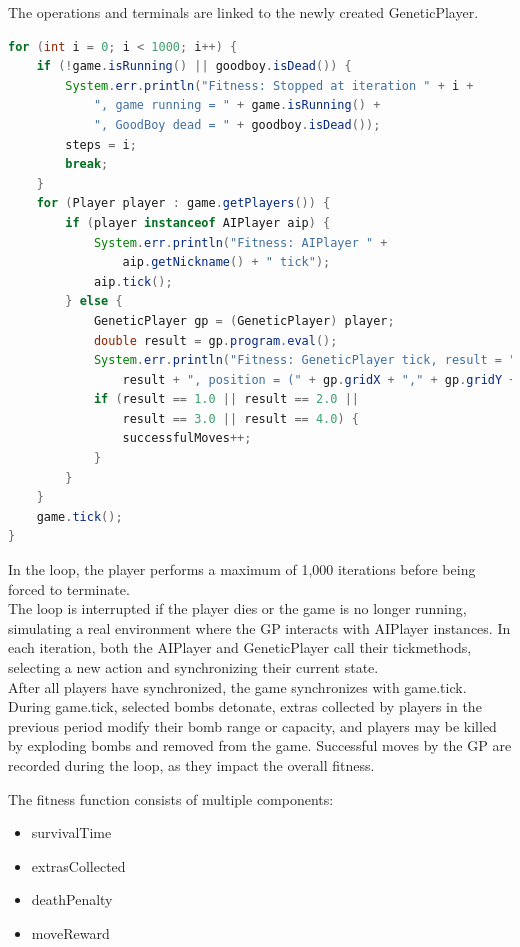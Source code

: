\documentclass[sigconf]{acmart} %
\begin{document}
\begin{enumerate}
The operations and terminals are linked to the newly created GeneticPlayer. 

\begin{lstlisting}[language=Java]
for (int i = 0; i < 1000; i++) {
    if (!game.isRunning() || goodboy.isDead()) {
        System.err.println("Fitness: Stopped at iteration " + i +
            ", game running = " + game.isRunning() +
            ", GoodBoy dead = " + goodboy.isDead());
        steps = i;
        break;
    }
    for (Player player : game.getPlayers()) {
        if (player instanceof AIPlayer aip) {
            System.err.println("Fitness: AIPlayer " +
                aip.getNickname() + " tick");
            aip.tick();
        } else {
            GeneticPlayer gp = (GeneticPlayer) player;
            double result = gp.program.eval();
            System.err.println("Fitness: GeneticPlayer tick, result = " +
                result + ", position = (" + gp.gridX + "," + gp.gridY + ")");
            if (result == 1.0 || result == 2.0 ||
                result == 3.0 || result == 4.0) {
                successfulMoves++;
            }
        }
    }
    game.tick();
}
\end{lstlisting}

In the loop, the player performs a maximum of 1,000 iterations before being forced to terminate. \\ 
The loop is interrupted if the player dies or the game is no longer running, simulating a real environment where the GP interacts with AIPlayer instances. In each iteration, both the AIPlayer and GeneticPlayer call their tickmethods, selecting a new action and synchronizing their current state. \\ 
After all players have synchronized, the game synchronizes with game.tick. During game.tick, selected bombs detonate, extras collected by players in the previous period modify their bomb range or capacity, and players may be killed by exploding bombs and removed from the game. Successful moves by the GP are recorded during the loop, as they impact the overall fitness.

The fitness function consists of multiple components: 
\begin{itemize}
      \item survivalTime 
      \item extrasCollected 
      \item deathPenalty 
      \item moveReward 
\end{itemize}


\end{enumerate}
\end{document}
